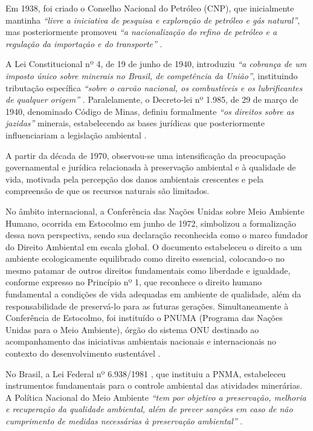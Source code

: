 Em 1938, foi criado o Conselho Nacional do Petróleo (CNP), que inicialmente mantinha \textit{``livre a iniciativa de pesquisa e exploração de petróleo e gás natural''}, mas posteriormente promoveu \textit{``a nacionalização do refino de petróleo e a regulação da importação e do transporte''} \cite{mme2025linha}.

A Lei Constitucional nº 4, de 19 de junho de 1940, introduziu \textit{``a cobrança de um imposto único sobre minerais no Brasil, de competência da União''}, instituindo tributação específica \textit{``sobre o carvão nacional, os combustíveis e os lubrificantes de qualquer origem''} \cite{mme2025linha}. Paralelamente, o Decreto-lei nº 1.985, de 29 de março de 1940, denominado Código de Minas, definiu formalmente \textit{``os direitos sobre as jazidas''} minerais, estabelecendo as bases jurídicas que posteriormente influenciariam a legislação ambiental \cite{mme2025linha}.

A partir da década de 1970, observou-se uma intensificação da preocupação governamental e jurídica relacionada à preservação ambiental e à qualidade de vida, motivada pela percepção dos danos ambientais crescentes e pela compreensão de que os recursos naturais são limitados.

No âmbito internacional, a Conferência das Nações Unidas sobre Meio Ambiente Humano, ocorrida em Estocolmo em junho de 1972, simbolizou a formalização dessa nova perspectiva, sendo sua declaração reconhecida como o marco fundador do Direito Ambiental em escala global. O documento estabeleceu o direito a um ambiente ecologicamente equilibrado como direito essencial, colocando-o no mesmo patamar de outros direitos fundamentais como liberdade e igualdade, conforme expresso no Princípio nº 1, que reconhece o direito humano fundamental a condições de vida adequadas em ambiente de qualidade, além da responsabilidade de preservá-lo para as futuras gerações. Simultaneamente à Conferência de Estocolmo, foi instituído o PNUMA (Programa das Nações Unidas para o Meio Ambiente), órgão do sistema ONU destinado ao acompanhamento das iniciativas ambientais nacionais e internacionais no contexto do desenvolvimento sustentável \cite{barros2017legislacao}.

No Brasil, a Lei Federal nº 6.938/1981 \cite{brasil1981lei6938}, que instituiu a PNMA, estabeleceu instrumentos fundamentais para o controle ambiental das atividades minerárias. A Política Nacional do Meio Ambiente \textit{``tem por objetivo a preservação, melhoria e recuperação da qualidade ambiental, além de prever sanções em caso de não cumprimento de medidas necessárias à preservação ambiental''} \cite{jazida2022leis}.

